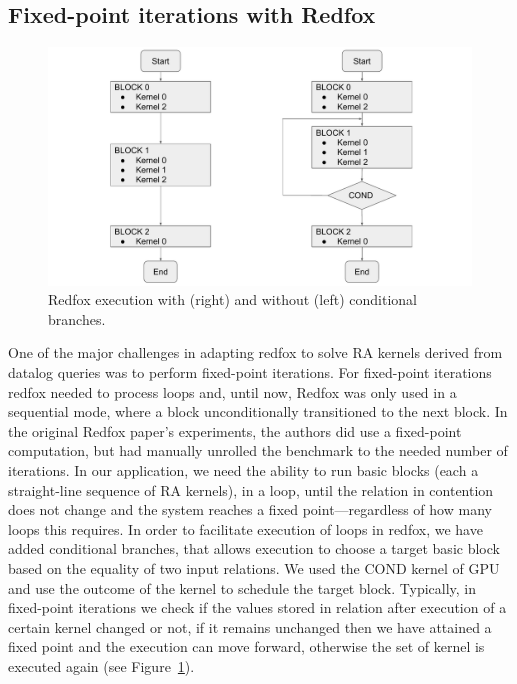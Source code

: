 \subsection{Fixed-point iterations with Redfox}
\begin{figure}
	\centering
	\vspace{-0.1in}
	\includegraphics[width=.99\linewidth]{redfox-brances.pdf}
\caption{Redfox execution with (right) and without (left) conditional branches. \label{fig:scale}}
\vspace{-0.2in}
\end{figure}

One of the major challenges in adapting redfox to solve RA kernels derived from datalog
queries was to perform fixed-point iterations. For fixed-point iterations redfox needed to process loops and, until now, Redfox
was only used in a sequential mode, where a block unconditionally transitioned to the next block. In the original Redfox paper's experiments, the authors did use a fixed-point computation, but had manually unrolled the benchmark to the needed number of iterations. In our application,
we need the ability to run basic blocks (each a straight-line sequence of RA kernels), in a loop, until the 
relation in contention does not change and the system reaches a fixed point---regardless of how many loops this requires. 
In order to facilitate execution of loops in redfox, we have added conditional branches, that allows execution to choose a target basic block based on the equality of two input relations. We used the COND kernel of GPU and use the outcome of the kernel to schedule the target block. 
Typically, in fixed-point iterations we check if the values stored in relation after execution of a certain kernel changed or not, if it remains unchanged then
we have attained a fixed point and the execution can move forward, otherwise the set of kernel is executed again (see Figure~\ref{fig:scale}).


